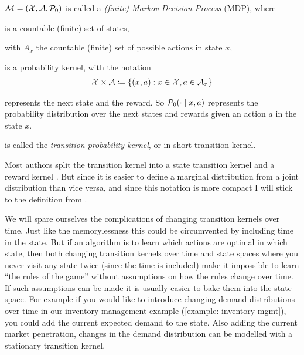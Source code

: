\begin{definition}
	\(\mathcal{M}=(\mathcal{X},\mathcal{A},\mathcal{P}_0) \) is called a \emph{(finite) Markov Decision Process} (MDP), where
	\begin{description}[noitemsep]
		\item[\(\cX\)] is a countable (finite) set of states,
		\item[\(\cA=(\cA_x)_{x\in\cX}\)] with \(A_x\) the countable (finite) set of possible actions in state \(x\),
		\item[\(\cP_0\colon (\cX\times\cA) \times \sigma_{\cX\times\R} \to \R\)] is a probability kernel, with the notation 
		\begin{align}\label{notation: XxA}
			\mathcal{X}\times\mathcal{A}\coloneqq \{(x,a): x\in\mathcal{X}, a\in\mathcal{A}_x \} 
		\end{align}
		\item[\(\cX\times\R\)] represents the next state and the reward. So \(\mathcal{P}_0(\cdot\mid x,a) \) represents the probability distribution over the next states and rewards given an action \(a\) in the state \(x\).
		\item[\(\cP_0\)] is called the \emph{transition probability kernel}, or in short transition kernel.  
	\end{description}
\end{definition}
\begin{remark}\label{split state/reward transition kernel }
	Most authors split the transition kernel into a state transition kernel and a reward kernel \parencite[e.g.][]{putermanMarkovDecisionProcesses2005}. But since it is easier to define a marginal distribution from a joint distribution than vice versa, and since this notation is more compact I will stick to the definition from \textcite{szepesvariAlgorithmsReinforcementLearning2010}. 
	
	We will spare ourselves the complications of changing transition kernels over time. Just like the memorylessness this could be circumvented by including time in the state. But if an algorithm is to learn which actions are optimal in which state, then both changing transition kernels over time and state spaces where you never visit any state twice (since the time is included) make it impossible to learn ``the rules of the game'' without assumptions on how the rules change over time. If such assumptions can be made it is usually easier to bake them into the state space. For example if you would like to introduce changing demand distributions over time in our inventory management example (\ref{example: inventory mgmt}), you could add the current expected demand to the state. Also adding the current market penetration, changes in the demand distribution can be modelled with a stationary transition kernel. 
\end{remark}

